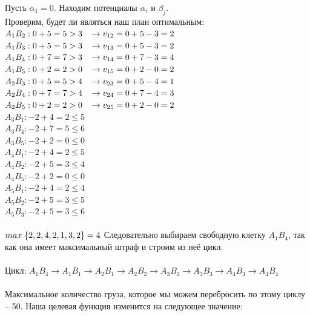\documentclass[14pt,a4paper,fleqn]{extarticle}
\begin{document}
Пусть $\alpha_1 = 0$. Находим потенциалы $\alpha_i$ и $\beta_j$.\\
Проверим, будет ли являться наш план оптимальным:\\
$A_1B_2: 0 + 5 = 5 > 3 \hspace*{0.3cm} \rightarrow v_{12} = 0 + 5 - 3 = 2$\\
$A_1B_3: 0 + 5 = 5 > 3 \hspace*{0.3cm} \rightarrow v_{13} = 0 + 5 - 3 = 2$\\
$A_1B_4: 0 + 7 = 7 > 3 \hspace*{0.3cm} \rightarrow v_{14} = 0 + 7 - 3 = 4$\\
$A_1B_5: 0 + 2 = 2 > 0 \hspace*{0.3cm} \rightarrow v_{15} = 0 + 2 - 0 = 2$\\
$A_2B_3: 0 + 5 = 5 > 4 \hspace*{0.3cm} \rightarrow v_{23} = 0 + 5 - 4 = 1$\\
$A_2B_4: 0 + 7 = 7 > 4 \hspace*{0.3cm} \rightarrow v_{24} = 0 + 7 - 4 = 3$\\
$A_2B_5: 0 + 2 = 2 > 0 \hspace*{0.3cm} \rightarrow v_{25} = 0 + 2 - 0 = 2$\\
$A_3B_1: -2 + 4 = 2 \leq 5$\\
$A_3B_4: -2 + 7 = 5 \leq 6$\\
$A_3B_5: -2 + 2 = 0 \leq 0$\\
$A_4B_1: -2 + 4 = 2 \leq 5$\\
$A_4B_2: -2 + 5 = 3 \leq 4$\\
$A_4B_5: -2 + 2 = 0 \leq 0$\\
$A_5B_1: -2 + 4 = 2 \leq 4$\\
$A_5B_2: -2 + 5 = 3 \leq 5$\\
$A_5B_3: -2 + 5 = 3 \leq 6$\\\\
$max\hspace*{0.1cm}\{2,2,4,2,1,3,2\} = 4$
\newpage
Следовательно выбираем свободную клетку $A_1B_4$, так как она имеет максимальный штраф и строим из неё цикл.\\\\
Цикл: $A_1B_4 \rightarrow A_1B_1 \rightarrow A_2B_1 \rightarrow A_2B_2 \rightarrow A_3B_2 \rightarrow A_3B_3 \rightarrow A_4B_3 \rightarrow A_4B_4$\\\\
Максимальное количество груза, которое мы можем перебросить по этому циклу -- 50. Наша целевая функция изменится на следующее значение:\\\\
\end{document}
